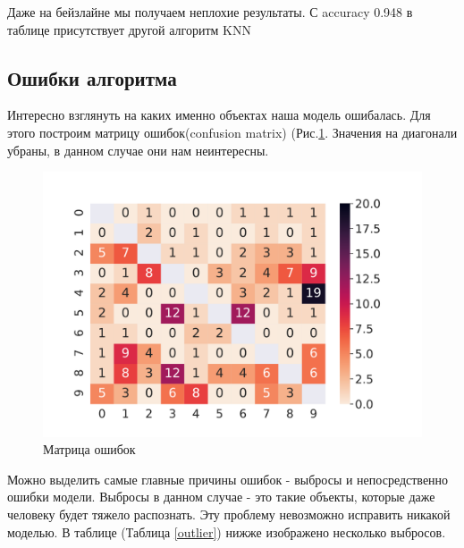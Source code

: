 \documentclass[12pt,fleqn]{article}
\begin{document}
Даже на бейзлайне мы получаем неплохие результаты. С accuracy 0.948 в таблице присутствует другой
алгоритм KNN \cite{deformationmodels}


\subsection{Ошибки алгоритма}

Интересно взглянуть на каких именно объектах наша модель ошибалась. Для этого построим 
матрицу ошибок(confusion matrix) (Рис.\ref{pic3}. Значения на диагонали убраны, в данном случае они нам неинтересны.
\newpage
\begin{figure}
    \centering
    \includegraphics[width=12cm]{task4.pdf}
    \caption{Матрица ошибок}
    \label{pic3}
\end{figure}

Можно выделить самые главные причины ошибок - выбросы и непосредственно ошибки модели. Выбросы в данном случае - это такие объекты, 
которые даже человеку будет тяжело распознать. Эту проблему невозможно исправить никакой моделью. В таблице (Таблица \ref{outlier}) нижже
изображено несколько выбросов.
\end{document}
